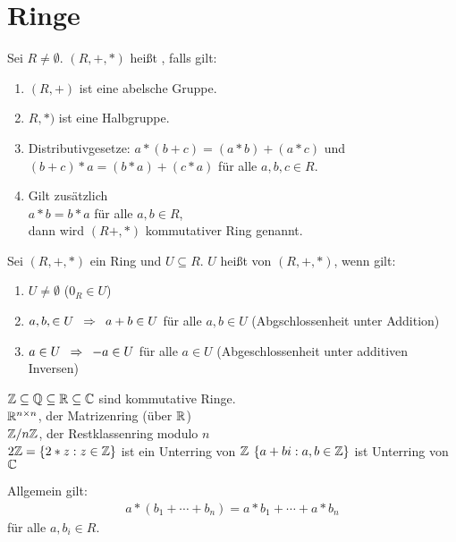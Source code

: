 \section{Ringe}

\begin{defin}
	Sei $R \neq \emptyset$. $(R, + , *)$ heißt , falls gilt:
	\begin{enumerate}
		\item $(R,+)$ ist eine abelsche Gruppe.
		\item $R,*)$ ist eine Halbgruppe.
		\item Distributivgesetze: $a*(b+c) = (a*b)+(a*c)$ und $(b+c)*a = (b*a) + (c*a)$ für alle $a,b,c \in R$.
		\item Gilt zusätzlich \\
		$a*b = b*a$ für alle $a,b \in R$, \\
		dann wird $(R+,*)$ kommutativer Ring genannt.
	\end{enumerate}
\end{defin}
%
\begin{defin}
	Sei $(R,+,*)$ ein Ring und $U \subseteq R$. $U$ heißt  von $(R,+,*)$, wenn gilt:
	\begin{enumerate}
		\item $U \neq \emptyset$ ($0_R \in U$)
		\item $a,b, \in U \enspace \Rightarrow \enspace a+b \in U$ für alle $a,b \in U$ (Abgschlossenheit unter Addition)
		\item $a \in U \enspace \Rightarrow \enspace -a \in U$ für alle $a \in U$ (Abgeschlossenheit unter additiven Inversen)
	\end{enumerate}
\end{defin}
%
\begin{bsp}
	$\mathbb{Z} \subseteq \mathbb{Q} \subseteq \mathbb{R} \subseteq \mathbb{C}$ sind kommutative Ringe. \\
	$\mathbb{R}^{n \times n}$, der Matrizenring (über $\mathbb{R}$) \\
	$\mathbb{Z} / n \mathbb{Z}$, der Restklassenring modulo $n$ \\
	$2\mathbb{Z} = \{ 2*z : z \in \mathbb{Z} \}$ ist ein Unterring von $\mathbb{Z}$
	$\{ a+bi : a,b \in \mathbb{Z} \}$ ist Unterring von $\mathbb{C}$
\end{bsp}
%
\begin{bem}
	Allgemein gilt:
	\begin{align*}
		a * (b_1 + \cdots + b_n) = a*b_1 + \cdots + a*b_n
	\end{align*}
	für alle $a,b_i \in R$.
\end{bem}
